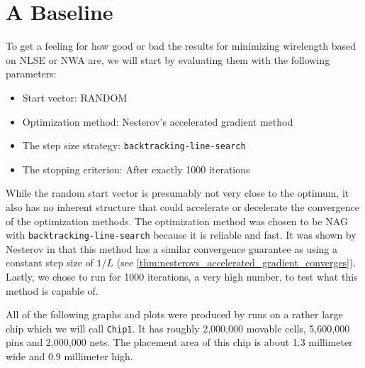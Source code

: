 \section{A Baseline} \label{sec:baseline}

To get a feeling for how good or bad the results for minimizing wirelength based on NLSE or NWA are,
we will start by evaluating them with the following parameters:
\begin{itemize}
 \item Start vector: RANDOM
 \item Optimization method: Nesterov's accelerated gradient method
 \item The step size strategy: \texttt{backtracking-line-search}
 \item The stopping criterion: After exactly 1000 iterations
\end{itemize}
While the random start vector is presumably not very close to the optimum,
it also has no inherent structure that could accelerate or decelerate the convergence of the optimization methods.
The optimization method was chosen to be NAG with \texttt{backtracking-line-search} because it is reliable and fast.
It was shown by Nesterov in \cite{Nesterov-NesterovAcceleratedGradient} that this method has a similar convergence guarantee
as using a constant step size of \(1/L\) (see \cref{thm:nesterovs_accelerated_gradient_converges}).
Lastly, we chose to run for 1000 iterations, a very high number, to test what this method is capable of.

All of the following graphs and plots were produced by runs on a rather large chip which we will call \texttt{Chip1}.
It has roughly 2,000,000 movable cells, 5,600,000 pins and 2,000,000 nets.
The placement area of this chip is about 1.3 millimeter wide and 0.9 millimeter high.

